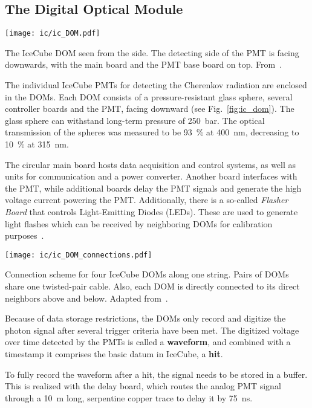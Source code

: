 \subsection{The Digital Optical Module}\label{DOM}
\begin{marginfigure}
    \texttt{[image: ic/ic\_DOM.pdf]}
    \caption[IceCube digital optical module]{The IceCube DOM seen from the side. The detecting side of the PMT is facing downwards, with the main board and the PMT base board on top. From~\cite{Aartsen2017}.}
\end{marginfigure}

The individual IceCube PMTs for detecting the Cherenkov radiation are enclosed in the DOMs. Each DOM consists of a pressure-resistant glass sphere, several controller boards and the PMT, facing downward (see Fig.~\ref{fig:ic_dom}). The glass sphere can withstand long-term pressure of \SI{250}{\bar}. The optical transmission of the spheres was measured to be \SI{93}{\percent} at \SI{400}{\nm}, decreasing to \SI{10}{\percent} at \SI{315}{\nm}.

The circular main board hosts data acquisition and control systems, as well as units for communication and a power converter. Another board interfaces with the PMT, while additional boards delay the PMT signals and generate the high voltage current powering the PMT\@. Additionally, there is a so-called \textit{Flasher Board} that controls Light-Emitting Diodes (LEDs). These are used to generate light flashes which can be received by neighboring DOMs for calibration purposes~.

\begin{marginfigure}
    \texttt{[image: ic/ic\_DOM\_connections.pdf]}
    \caption[IceCube DOM connections]{Connection scheme for four IceCube DOMs along one string. Pairs of DOMs share one twisted-pair cable. Also, each DOM is directly connected to its direct neighbors above and below. Adapted from~\cite{Aartsen2017}.}
\end{marginfigure}

Because of data storage restrictions, the DOMs only record and digitize the photon signal after several trigger criteria have been met. The digitized voltage over time detected by the PMTs is called a \textbf{waveform}, and combined with a timestamp it comprises the basic datum in IceCube, a \textbf{hit}.

To fully record the waveform after a hit, the signal needs to be stored in a buffer. This is realized with the delay board, which routes the analog PMT signal through a \SI{10}{\m} long, serpentine copper trace to delay it by \SI{75}{\ns}.

